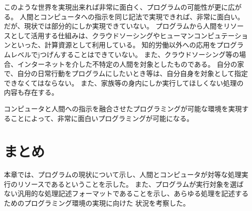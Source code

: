 このような世界を実現出来れば非常に面白く、プログラムの可能性が更に広がる。
人間とコンピュータへの指示を同じ記法で実現できれば、非常に面白い。
だが、現状では部分的にしか実現できていない。
プログラムから人間をリソースとして活用する仕組みは、クラウドソーシングやヒューマンコンピュテーションといった、計算資源として利用している。
知的労働以外への応用をプログラムレベルでjつげんすることはできていない。
また、クラウドソーシング等の場合、インターネットを介した不特定の人間を対象としたものである。
自分の家で、自分の日常行動をプログラムにしたいとき等は、自分自身を対象として指定できなくてはならない。
また、家族等の身内にしか実行してほしくない処理の内容も存在する。

コンピュータと人間への指示を融合させたプログラミングが可能な環境を実現することによって、非常に面白いプログラミングが可能になる。

\section{まとめ}\label{ux307eux3068ux3081}

本章では、プログラムの現状について示し、人間とコンピュータが対等な処理実行のリソースであるということを示した。
また、プログラムが実行対象を選ばない汎用的な処理記述フォーマットであることを示し、あらゆる処理を記述するためのプログラミング環境の実現に向けた
状況を考察した。
